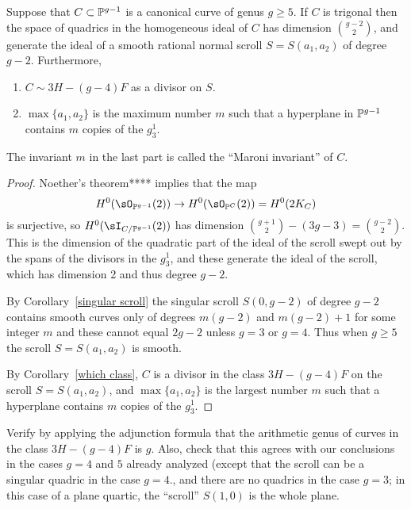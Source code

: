 \begin{theorem}
Suppose that $C\subset \PP^{g-1}$ is a canonical curve of genus $g\geq 5$. If $C$ is trigonal then the space of quadrics in the homogeneous ideal of $C$ has dimension ${g-2 \choose 2}$, and generate the ideal of a smooth rational normal scroll $S = S(a_1,a_2)$ of degree $g-2$. Furthermore,
\begin{enumerate}
\item $C\sim 3H -(g-4)F$ as a divisor on $S$.
\item $\max\{a_1,a_2\}$ is the maximum number $m$ such that a hyperplane in $\PP^{g-1}$ contains $m$ copies of the $g^1_3$. 
\end{enumerate}
\end{theorem}

The invariant $m$ in the last part is called the ``Maroni invariant'' of $C$.

\begin{proof}
Noether's theorem****  implies that the map
$$
H^0(\sO_{\PP^{g-1}}(2)) \to H^0(\sO_{\PP^{C}}(2)) = H^0(2K_C)
$$
is surjective, so $H^0(\sI_{C/\PP^{g-1}}(2))$ has dimension ${g+1\choose 2} - (3g-3) = {g-2\choose 2}$. This is the dimension of the quadratic part
of the ideal of the scroll swept out by the spans of the divisors in the $g^1_3$, and these generate the ideal of the scroll, which has dimension 2 and thus
degree $g-2$.

By Corollary~\ref{singular scroll} the singular scroll $S(0,g-2)$ of degree $g-2$ contains smooth curves only of degrees $m(g-2)$ and $m(g-2)+1$ for
some integer $m$ and these
cannot equal $2g-2$ unless $g= 3$ or $g=4$. Thus when $g\geq 5$ the scroll $S = S(a_1,a_2)$ is  smooth.

By Corollary~\ref{which class}, $C$ is a divisor in the class $3H-(g-4)F$ on the scroll $S = S(a_1,a_2)$, and $\max\{a_1, a_2\}$ is the largest
number $m$ such that a hyperplane contains $m$ copies of the $g^1_3$. 
\end{proof}

\begin{exercise}
Verify by applying the adjunction formula that the arithmetic genus of curves in the class $3H-(g-4)F$ is $g$. Also, check that this agrees with our conclusions in the cases $g = 4$ and $5$ already analyzed (except that the scroll can be a singular quadric in the case $g=4$., and there are no
quadrics in the case $g=3$; in this case of a plane quartic, the ``scroll'' $S(1,0)$ is the whole plane.
\end{exercise}

